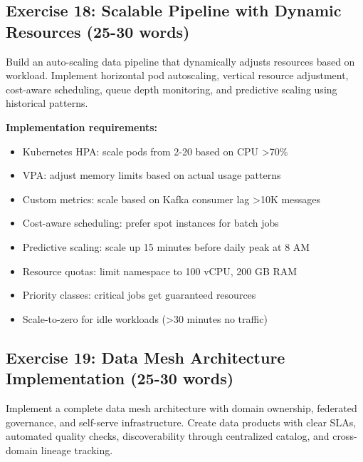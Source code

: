 \subsection{Exercise 18: Scalable Pipeline with Dynamic Resources (25-30 words)}

Build an auto-scaling data pipeline that dynamically adjusts resources based on workload. Implement horizontal pod autoscaling, vertical resource adjustment, cost-aware scheduling, queue depth monitoring, and predictive scaling using historical patterns.

\textbf{Implementation requirements:}
\begin{itemize}
    \item Kubernetes HPA: scale pods from 2-20 based on CPU >70\%
    \item VPA: adjust memory limits based on actual usage patterns
    \item Custom metrics: scale based on Kafka consumer lag >10K messages
    \item Cost-aware scheduling: prefer spot instances for batch jobs
    \item Predictive scaling: scale up 15 minutes before daily peak at 8 AM
    \item Resource quotas: limit namespace to 100 vCPU, 200 GB RAM
    \item Priority classes: critical jobs get guaranteed resources
    \item Scale-to-zero for idle workloads (>30 minutes no traffic)
\end{itemize}

\subsection{Exercise 19: Data Mesh Architecture Implementation (25-30 words)}

Implement a complete data mesh architecture with domain ownership, federated governance, and self-serve infrastructure. Create data products with clear SLAs, automated quality checks, discoverability through centralized catalog, and cross-domain lineage tracking.

